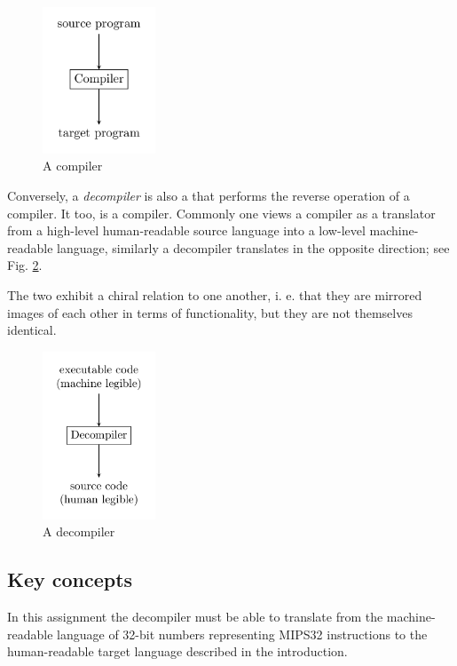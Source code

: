 \begin{figure}[H]
  \centering
  \includegraphics[width=0.3\textwidth]{figures/compiler.png}
  \caption{A compiler}
  \label{fig:compiler}
\end{figure}

Conversely, a \emph{decompiler} is also a that performs the reverse
operation of a compiler. It too, is a compiler. Commonly one views a
compiler as a translator from a high-level human-readable source
language into a low-level machine-readable language, similarly a
decompiler translates in the opposite direction; see
Fig. \ref{fig:decompiler}. 

The two exhibit a chiral relation to one another, i. e. that they are
mirrored images of each other in terms of functionality, but they are
not themselves identical.

\begin{figure}[H]
  \centering
  \includegraphics[width=0.3\textwidth]{figures/decompiler.png}
  \caption{A decompiler}
  \label{fig:decompiler}
\end{figure}

\subsection{Key concepts}

In this assignment the decompiler must be able to translate from the
machine-readable language of 32-bit numbers representing MIPS32
instructions to the human-readable target language described in the
introduction.

